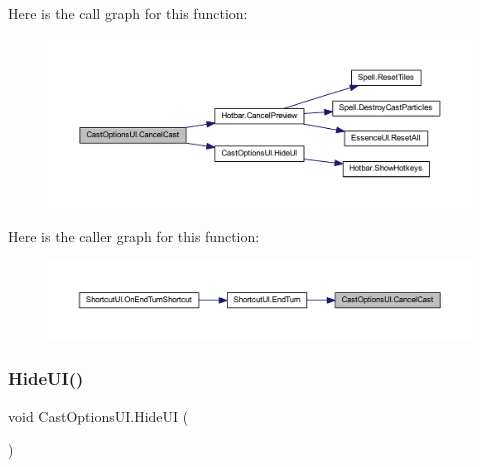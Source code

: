 Here is the call graph for this function\+:
\nopagebreak
\begin{figure}[H]
\begin{center}
\leavevmode
\includegraphics[width=350pt]{class_cast_options_u_i_a78fb30f53f8da2443cb801bd878dc149_cgraph}
\end{center}
\end{figure}
Here is the caller graph for this function\+:
\nopagebreak
\begin{figure}[H]
\begin{center}
\leavevmode
\includegraphics[width=350pt]{class_cast_options_u_i_a78fb30f53f8da2443cb801bd878dc149_icgraph}
\end{center}
\end{figure}
\mbox{\label{class_cast_options_u_i_affc98e48b03c51f4dddda5cb96920697}} 
\subsubsection{\texorpdfstring{HideUI()}{HideUI()}}
{\footnotesize\ttfamily void Cast\+Options\+U\+I.\+Hide\+UI (\begin{DoxyParamCaption}{ }\end{DoxyParamCaption})}

